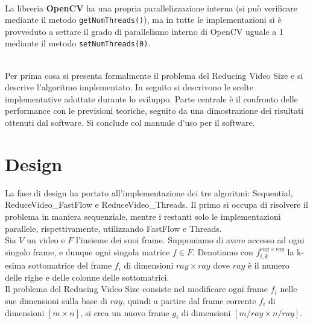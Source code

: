 \documentclass[12pt]{article}
\begin{document}
\\La libreria \textbf{OpenCV} ha una propria parallelizzazione interna (si pu\`o verificare mediante il metodo \texttt{getNumThreads()}), ma in tutte le implementazioni si \`e provveduto a settare il grado di parallelismo interno di OpenCV uguale a 1 mediante il metodo \texttt{setNumThreads(0)}.

\\Per prima cosa si presenta formalmente il problema del Reducing Video Size e si descrive l'algoritmo implementato. In seguito si descrivono le scelte implementative adottate durante lo sviluppo. Parte centrale \`e il confronto delle performance con le previsioni teoriche, seguito da una dimostrazione dei risultati ottenuti dal software. Si conclude col manuale d'uso per il software.



\section{Design}
La fase di design ha portato all'implementazione dei tre algoritmi: Sequential, ReduceVideo\_FastFlow e ReduceVideo\_Threads. Il primo si occupa di risolvere il problema in maniera sequenziale, mentre i restanti solo le implementazioni parallele, rispettivamente, utilizzando FastFlow e Threads.
\\Sia $V$ un video e $F$ l'insieme dei suoi frame. Supponiamo di avere accesso ad ogni singolo frame, e dunque ogni singola matrice $ f \in F$.
Denotiamo con $f_{i,k}^{ray \times ray}$ la k-esima sottomatrice del frame $f_i$ di dimensioni $ray \times ray$ dove $ray$ \`e il numero delle righe e delle colonne delle sottomatrici. %
\\Il problema del Reducing Video Size consiste nel modificare ogni frame $f_i$ nelle sue dimensioni sulla base di $ray$, quindi a partire dal frame corrente $f_i$ di dimensioni $[m \times n]$, si crea un nuovo frame $g_i$ di dimensioni $[m/ray \times n/ray]$.
\end{document}
